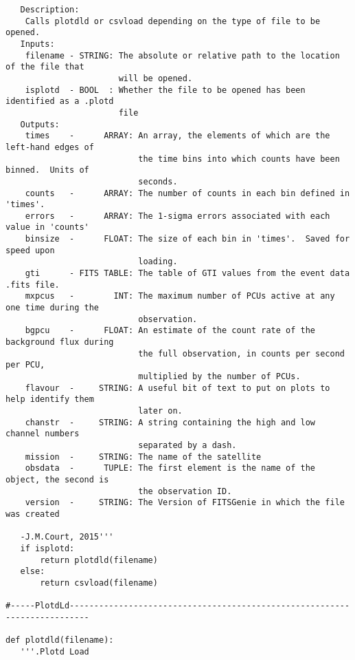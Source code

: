 \begin{verbatim}
   Description:
    Calls plotdld or csvload depending on the type of file to be opened.
   Inputs:
    filename - STRING: The absolute or relative path to the location of the file that
                       will be opened.
    isplotd  - BOOL  : Whether the file to be opened has been identified as a .plotd
                       file
   Outputs:
    times    -      ARRAY: An array, the elements of which are the left-hand edges of
                           the time bins into which counts have been binned.  Units of
                           seconds.
    counts   -      ARRAY: The number of counts in each bin defined in 'times'.
    errors   -      ARRAY: The 1-sigma errors associated with each value in 'counts'
    binsize  -      FLOAT: The size of each bin in 'times'.  Saved for speed upon
                           loading.
    gti      - FITS TABLE: The table of GTI values from the event data .fits file.
    mxpcus   -        INT: The maximum number of PCUs active at any one time during the
                           observation.
    bgpcu    -      FLOAT: An estimate of the count rate of the background flux during
                           the full observation, in counts per second per PCU,
                           multiplied by the number of PCUs.
    flavour  -     STRING: A useful bit of text to put on plots to help identify them
                           later on.
    chanstr  -     STRING: A string containing the high and low channel numbers
                           separated by a dash.
    mission  -     STRING: The name of the satellite
    obsdata  -      TUPLE: The first element is the name of the object, the second is
                           the observation ID.
    version  -     STRING: The Version of FITSGenie in which the file was created
    
   -J.M.Court, 2015'''
   if isplotd:
       return plotdld(filename)
   else:
       return csvload(filename)

#-----PlotdLd--------------------------------------------------------------------------

def plotdld(filename):
   '''.Plotd Load


\end{verbatim}
